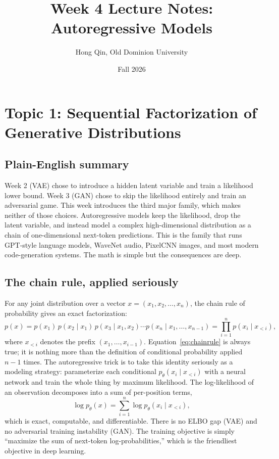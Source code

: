 \documentclass[11pt]{article}
\title{Week 4 Lecture Notes: Autoregressive Models}
\author{Hong Qin, Old Dominion University}
\date{Fall 2026}
\theoremstyle{remark}
\begin{document}
\maketitle
\tableofcontents
\clearpage

\section{Topic 1: Sequential Factorization of Generative Distributions}

\subsection{Plain-English summary}

Week 2 (VAE) chose to introduce a hidden latent variable and train a likelihood lower bound. Week 3 (GAN) chose to skip the likelihood entirely and train an adversarial game. This week introduces the third major family, which makes neither of those choices. Autoregressive models keep the likelihood, drop the latent variable, and instead model a complex high-dimensional distribution as a chain of one-dimensional next-token predictions. This is the family that runs GPT-style language models, WaveNet audio, PixelCNN images, and most modern code-generation systems. The math is simple but the consequences are deep.

\subsection{The chain rule, applied seriously}

For any joint distribution over a vector $x = (x_1, x_2, \dots, x_n)$, the chain rule of probability gives an exact factorization:
\begin{equation}
p(x) = p(x_1)\, p(x_2 \mid x_1)\, p(x_3 \mid x_1, x_2) \cdots p(x_n \mid x_1, \dots, x_{n-1})
     = \prod_{i=1}^{n} p\!\left(x_i \mid x_{<i}\right),
\label{eq:chainrule}
\end{equation}
where $x_{<i}$ denotes the prefix $(x_1, \dots, x_{i-1})$. Equation~\eqref{eq:chainrule} is always true; it is nothing more than the definition of conditional probability applied $n-1$ times. The autoregressive trick is to take this identity seriously as a modeling strategy: parameterize each conditional $p_\theta(x_i \mid x_{<i})$ with a neural network and train the whole thing by maximum likelihood. The log-likelihood of an observation decomposes into a sum of per-position terms,
\begin{equation}
\log p_\theta(x) = \sum_{i=1}^{n} \log p_\theta\!\left(x_i \mid x_{<i}\right),
\label{eq:loglik}
\end{equation}
which is exact, computable, and differentiable. There is no ELBO gap (VAE) and no adversarial training instability (GAN). The training objective is simply ``maximize the sum of next-token log-probabilities,'' which is the friendliest objective in deep learning.
\end{document}
